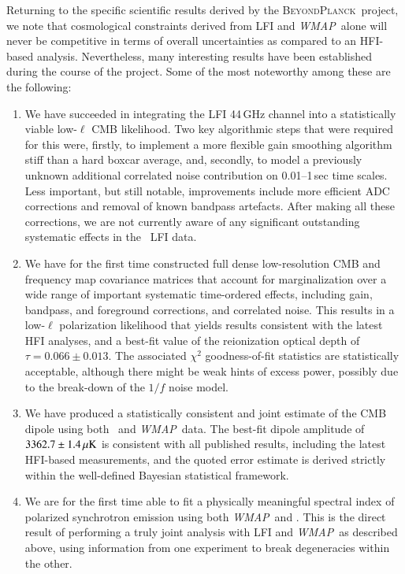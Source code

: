 \documentclass[twocolumn]{aa}
\def\WMAP{\emph{WMAP}}
\newcommand{\BP}{\textsc{BeyondPlanck}}
\begin{document}
Returning to the specific scientific results derived by the
\BP\ project, we note that cosmological constraints derived from LFI
and \WMAP\ alone will never be competitive in terms of overall
uncertainties as compared to an HFI-based analysis. Nevertheless, many
interesting results have been established during the course of the
project. Some of the most noteworthy among these are the
following:
\begin{enumerate}
  \item We have succeeded in integrating the LFI 44\,GHz channel into
    a statistically viable low-$\ell$ CMB likelihood. Two key
    algorithmic steps that were required for this were, firstly, to
    implement a more flexible gain smoothing algorithm stiff than a
    hard boxcar average, and, secondly, to model a previously unknown
    additional correlated noise contribution on 0.01--1\,sec time
    scales. Less important, but still notable, improvements include
    more efficient ADC corrections and removal of known bandpass
    artefacts. After making all these corrections, we are not
    currently aware of any significant outstanding systematic effects
    in the \Planck\ LFI data.
  \item We have for the first time constructed full dense
    low-resolution CMB and frequency map covariance matrices that
    account for marginalization over a wide range of important
    systematic time-ordered effects, including gain, bandpass, and
    foreground corrections, and correlated noise. This results in a
    low-$\ell$ polarization likelihood that yields results consistent
    with the latest HFI analyses, and a best-fit value of the
    reionization optical depth of
    $\tau=0.066\pm0.013$. The associated $\chi^2$
    goodness-of-fit statistics are statistically acceptable, although
    there might be weak hints of excess power, possibly due to the
    break-down of the $1/f$ noise model.
  \item We have produced a statistically consistent and joint estimate
    of the CMB dipole using both \Planck\ and \WMAP\ data. The
    best-fit dipole amplitude of $3362.7\pm1.4\muK$ is consistent with
    all published results, including the latest HFI-based
    measurements, and the quoted error estimate is derived strictly
    within the well-defined Bayesian statistical framework.
  \item We are for the first time able to fit a physically
    meaningful spectral index of polarized synchrotron emission using
    both \WMAP\ and \Planck. This is the direct result of performing a
    truly joint analysis with LFI and \WMAP\, as described above,
    using information from one experiment to break degeneracies within
    the other.
\end{enumerate}
\end{document}
